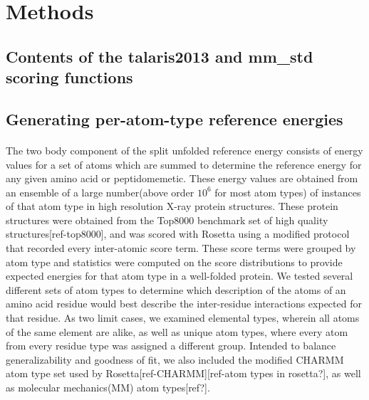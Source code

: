 \section{Methods}

\subsection{Contents of the talaris2013 and mm\_std scoring functions}


\subsection{Generating per-atom-type reference energies}
\paragraph{}
The two body component of the split unfolded reference energy consists of energy values for a set of atoms which are summed to determine the reference energy for any given amino acid or peptidomemetic.
These energy values are obtained from an ensemble of a large number(above order $10^6$ for most atom types) of instances of that atom type in high resolution X-ray protein structures.
These protein structures were obtained from the Top8000 benchmark set of high quality structures[ref-top8000], and was scored with Rosetta using a modified protocol that recorded every inter-atomic score term.
These score terms were grouped by atom type and statistics were computed on the score distributions to provide expected energies for that atom type in a well-folded protein.
We tested several different sets of atom types to determine which description of the atoms of an amino acid residue would best describe the inter-residue interactions expected for that residue.
As two limit cases, we examined elemental types, wherein all atoms of the same element are alike, as well as unique atom types, where every atom from every residue type was assigned a different group.
Intended to balance generalizability and goodness of fit, we also included the modified CHARMM atom type set used by Rosetta[ref-CHARMM][ref-atom types in rosetta?], as well as molecular mechanics(MM) atom types[ref?].


